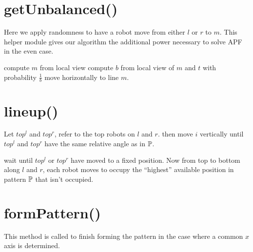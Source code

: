 \documentclass[preprint,10pt]{elsarticle}
\begin{document}
\section{getUnbalanced()} 
Here we apply randomness to have a robot move from either $l$ or $r$ to $m$.
This helper module gives our algorithm the additional power necessary to 
solve APF in the even case.
\begin{algorithm}
\begin{algorithmic}[1]
	\State compute $m$ from local view
	\State compute $b$ from local view of $m$ and $t$
	\State with probability $\frac{1}{b}$ move horizontally to line $m$. 

\EndProcedure
\end{algorithmic}
\end{algorithm}

\section{lineup()} 
	\begin{algorithm}
	\begin{algorithmic}[1]
		\State Let $top^l$ and $top^r$, refer to the top robots on $l$ and $r$.
			\State then move $i$ vertically until
			$top^l$ and $top^r$ have the same relative angle as in $\mathbb{P}$.
		\EndIf

			\State wait until $top^l$ or $top^r$ have moved to a fixed position. Now
			from top to bottom along $l$ and $r$, each robot moves to occupy the 
			``highest'' available position in pattern $\mathbb{P}$ that isn't occupied.
		\EndIf
	\EndProcedure
	\end{algorithmic}
	\end{algorithm}
\section{formPattern()} 
This method is called to finish forming the pattern in the case where
a common $x$ axis is determined.
\begin{algorithm}
\begin{algorithmic}[1]
	\Switch{state}
		\Case{LEFT}
			
		\EndCase
	\EndSwitch
\EndProcedure
\end{algorithmic}
\end{algorithm}
\end{document}

